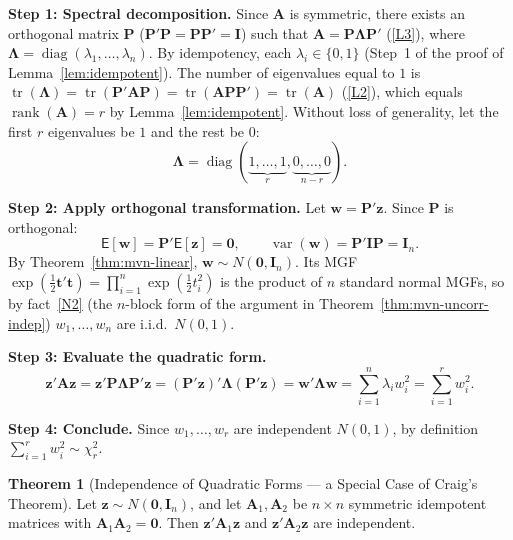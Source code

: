 \documentclass[12pt,a4paper]{article}
\makeatletter
\theoremstyle{definition}
\newtheorem{theorem}{Theorem}[section]
\renewenvironment{proof}[1][\proofname]{\par
  \pushQED{\qed}%
  \normalfont \topsep6\p@\@plus6\p@\relax
  \trivlist
  \item[\hskip\labelsep\bfseries #1\@addpunct{.}]\ignorespaces
}{%
  \popQED\endtrivlist\@endpefalse
}
\newcommand\expc{\mathsf{E}}
\DeclareMathOperator\var{var}
\DeclareMathOperator\tr{tr}
\DeclareMathOperator\rank{rank}
\DeclareMathOperator\diag{diag}
\newcommand{\bI}{\mathbf{I}}
\newcommand{\bzero}{\mathbf{0}}
\newcommand{\bz}{\mathbf{z}}
\newcommand{\bw}{\mathbf{w}}
\newcommand{\bA}{\mathbf{A}}
\newcommand{\bP}{\mathbf{P}}
\makeatother
\begin{document}
\begin{proof}
\textbf{Step 1: Spectral decomposition.} Since $\bA$ is symmetric, there exists an orthogonal matrix $\bP$ ($\bP'\bP = \bP\bP' = \bI$) such that $\bA = \bP\boldsymbol\Lambda\bP'$ (\ref{L3}), where $\boldsymbol\Lambda = \diag(\lambda_1, \ldots, \lambda_n)$. By idempotency, each $\lambda_i \in \{0, 1\}$ (Step~1 of the proof of Lemma~\ref{lem:idempotent}). The number of eigenvalues equal to $1$ is $\tr(\boldsymbol\Lambda) = \tr(\bP'\bA\bP) = \tr(\bA\bP\bP') = \tr(\bA)$ (\ref{L2}), which equals $\rank(\bA) = r$ by Lemma~\ref{lem:idempotent}. Without loss of generality, let the first $r$ eigenvalues be $1$ and the rest be $0$:
\[
\boldsymbol\Lambda = \diag(\underbrace{1, \ldots, 1}_{r}, \underbrace{0, \ldots, 0}_{n-r}).
\]

\textbf{Step 2: Apply orthogonal transformation.} Let $\bw = \bP'\bz$. Since $\bP$ is orthogonal:
\[
\expc[\bw] = \bP'\expc[\bz] = \bzero, \qquad \var(\bw) = \bP'\bI\bP = \bI_n.
\]
By Theorem~\ref{thm:mvn-linear}, $\bw \sim N(\bzero, \bI_n)$. Its MGF $\exp(\tfrac{1}{2}\mathbf{t}'\mathbf{t}) = \prod_{i=1}^n \exp(\tfrac{1}{2}t_i^2)$ is the product of $n$ standard normal MGFs, so by fact~\ref{N2} (the $n$-block form of the argument in Theorem~\ref{thm:mvn-uncorr-indep}) $w_1, \ldots, w_n$ are i.i.d.\ $N(0, 1)$.

\textbf{Step 3: Evaluate the quadratic form.}
\[
\bz'\bA\bz = \bz'\bP\boldsymbol\Lambda\bP'\bz = (\bP'\bz)'\boldsymbol\Lambda(\bP'\bz) = \bw'\boldsymbol\Lambda\bw = \sum_{i=1}^{n}\lambda_i w_i^2 = \sum_{i=1}^{r} w_i^2.
\]

\textbf{Step 4: Conclude.} Since $w_1, \ldots, w_r$ are independent $N(0, 1)$, by definition $\sum_{i=1}^{r} w_i^2 \sim \chi^2_r$.
\end{proof}

\begin{theorem}[Independence of Quadratic Forms --- a Special Case of Craig's Theorem]\label{thm:cochran}
Let $\bz \sim N(\bzero, \bI_n)$, and let $\bA_1, \bA_2$ be $n \times n$ symmetric idempotent matrices with $\bA_1\bA_2 = \bzero$. Then $\bz'\bA_1\bz$ and $\bz'\bA_2\bz$ are independent.
\end{theorem}
\end{document}
